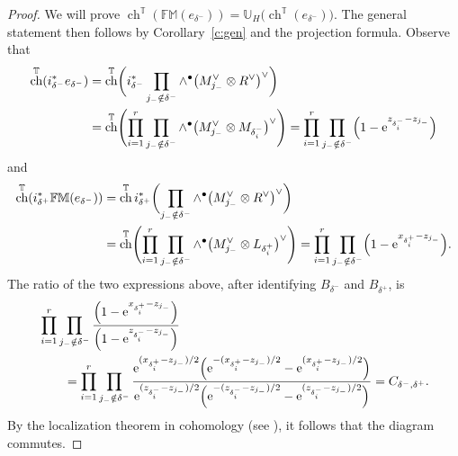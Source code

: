 \documentclass[pdftex]{sigma}
\numberwithin{equation}{section}
\newcommand{\UU}{\mathbb{U}}
\newcommand{\torus}{\mathbb{T}}
\newcommand{\FM}{\mathbb{FM}}
\DeclareMathOperator{\ch}{ch}
\newcommand{\MB}{M}
\newcommand{\LB}{L}
\newcommand{\z}{z}
\newcommand{\x}{x}
\begin{document}
\begin{proof}
We will prove
$\ch^\torus(\FM(e_{\delta^-})) = \UU_H \bigl( \ch^\torus(e_{\delta^-})\bigr)$.
 The general statement then follows by Corollary~\ref{c:gen} and the projection formula.
Observe that
\begin{align*}
\ch^\torus( i_{\delta^-}^* e_{\delta^-}) &=\ch^\torus\biggl( i_{\delta^-}^* \prod_{j_- \notin \delta^-} \wedge^\bullet \bigl(\MB_{j_-}^\vee \otimes R^\vee\bigr)^\vee \biggr)
\\
& =\ch^\torus\Biggl( \prod_{i=1}^r \prod_{j_- \notin \delta^-} \wedge^\bullet \bigl(\MB_{j_-}^\vee \otimes \MB_{\delta^-_i} \bigr)^\vee \Biggr)
=
\prod_{i=1}^r \prod_{j_- \notin \delta^-} \Bigl( 1 - {\rm e}^{\z_{\delta^-_i} - \z_{j_-}}\Bigr)
\end{align*}
and
\begin{align*}
\ch^\torus( i_{\delta^+}^* \FM(e_{\delta^-} ))& = \ch^\torus i_{\delta^+}^*\biggl( \prod_{j_- \notin \delta^-} \wedge^\bullet \bigl(\MB_{j_-}^\vee \otimes R^\vee\bigr)^\vee
\biggr) \\
& =
\ch^\torus\Biggl( \prod_{i=1}^r \prod_{j_- \notin \delta^-} \wedge^\bullet \bigl(\MB_{j_-}^\vee \otimes \LB_{\delta^+_i} \bigr)^\vee \Biggr)
=
\prod_{i=1}^r \prod_{j_- \notin \delta^-} \Bigl( 1 - {\rm e}^{\x_{\delta^+_i} - \z_{j_-}}\Bigr).
\end{align*}
The ratio of the two expressions above, after identifying $B_{\delta^-}$ and $B_{\delta^+}$, is
\begin{align*}
& \prod_{i=1}^r \prod_{j_- \notin \delta^-} \frac{\Bigl( 1 - {\rm e}^{\x_{\delta^+_i} - \z_{j_-}}\Bigr)}{\Bigl( 1 - {\rm e}^{\z_{\delta^-_i} - \z_{j_-}}\Bigr)} \\
&\qquad{}= \prod_{i=1}^r \prod_{j_- \notin \delta^-} \frac{ {\rm e}^{(\x_{\delta^+_i} - \z_{j_-})/2}\Bigl( {\rm e}^{-(\x_{\delta^+_i} - \z_{j_-})/2} - {\rm e}^{(\x_{\delta^+_i} - \z_{j_-})/2}\Bigr)}{ {\rm e}^{(\z_{\delta^-_i} - \z_{j_-})/2}\Bigl( {\rm e}^{-(\z_{\delta^-_i} - \z_{j_-})/2} - {\rm e}^{(\z_{\delta^-_i} - \z_{j_-})/2}\Bigr)}
= C_{\delta^-, \delta^+}.
\end{align*}
By the localization theorem in cohomology (see \cite{AB}), it follows that the diagram commutes.
\end{proof}
\end{document}
